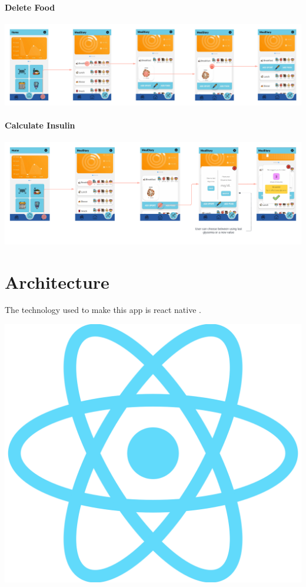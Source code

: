 \documentclass[12pt,hidelinks]{article}
\begin{document}
\paragraph{Delete Food}

\begin{center}
	\includegraphics[scale=0.21]{Delete Food}
\end{center}


\paragraph{Calculate Insulin}
\begin{center}
	\includegraphics[scale=0.117]{Insulin Calculation}
\end{center}

\newpage
\section{Architecture}
\vspace{10.5cm}
	The technology used to make this app is react native \cite{React Native}.
	\begin{center}

	\includegraphics[scale=0.1]{RN}
\end{center}
\end{document}
